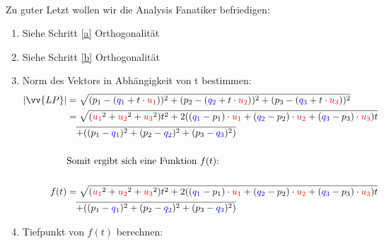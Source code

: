 \documentclass[main.tex]{subfiles}
\begin{document}
            \paragraph{} Zu guter Letzt wollen wir die Analysis Fanatiker befriedigen:
                \begin{enumerate}[1)]
                    \item Siehe Schritt \ref{a} Orthogonalität
                    \item Siehe Schritt \ref{b} Orthogonalität
                    \item Norm des Vektors in Abhängigkeit von t bestimmen:
                    \begin{align*}
                        |\vv{LP}| &= \sqrt{(p_1 - (\textcolor{blue}{q_1} + t \cdot \textcolor{red}{u_1}))^2 + (p_2 - (\textcolor{blue}{q_2} + t \cdot \textcolor{red}{u_2}))^2 + (p_3 - (\textcolor{blue}{q_3} + t\cdot \textcolor{red}{u_3}))^2} \\
                                  &= \sqrt{(\textcolor{red}{u_1}^2 + \textcolor{red}{u_2}^2 + \textcolor{red}{u_3}^2)t^2 + 2((\textcolor{blue}{q_1} - p_1) \cdot \textcolor{red}{u_1} + (\textcolor{blue}{q_2} - p_2) \cdot \textcolor{red}{u_2} + (\textcolor{blue}{q_3} - p_3) \cdot \textcolor{red}{u_3})t} \\
                                  & \quad \overline{+ ((p_1 - \textcolor{blue}{q_1})^2 + (p_2 - \textcolor{blue}{q_2})^2 + (p_3 - \textcolor{blue}{q_3})^2)}
                                  \\\\
                        & \text{Somit ergibt sich eine Funktion $f(t)$:} \\\\
                             f(t) &= \sqrt{(\textcolor{red}{u_1}^2 + \textcolor{red}{u_2}^2 + \textcolor{red}{u_3}^2)t^2 + 2((\textcolor{blue}{q_1} - p_1) \cdot \textcolor{red}{u_1} + (\textcolor{blue}{q_2} - p_2) \cdot \textcolor{red}{u_2} + (\textcolor{blue}{q_3} - p_3) \cdot \textcolor{red}{u_3})t} \\
                                  & \quad \overline{+ ((p_1 - \textcolor{blue}{q_1})^2 + (p_2 - \textcolor{blue}{q_2})^2 + (p_3 - \textcolor{blue}{q_3})^2)}
                    \end{align*}
                    \item Tiefpunkt von $f(t)$ berechnen:
                    \\\\
                    \begin{align*}

\end{align*}
\end{enumerate}
\end{document}
